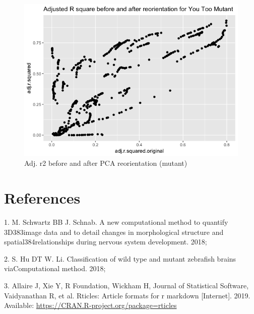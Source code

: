 \documentclass[10pt,letterpaper]{article}
\begin{document}
\begin{figure}[H]
\includegraphics[width=0.9\linewidth]{visualization_paper/r2_ro_comparison_yt} \caption{Adj. r2 before and after PCA reorientation (mutant)}\label{fig:Figure6}
\end{figure}

\section*{References}\label{references}

\hypertarget{refs}{}
\hypertarget{ref-Schwartz18}{}
1. M. Schwartz BB J. Schnab. A new computational method to quantify
3D383image data and to detail changes in morphological structure and
spatial384relationships during nervous system development. 2018;

\hypertarget{ref-Hu18}{}
2. S. Hu DT W. Li. Classification of wild type and mutant zebrafish
brains viaComputational method. 2018;

\hypertarget{ref-rticles19}{}
3. Allaire J, Xie Y, R Foundation, Wickham H, Journal of Statistical
Software, Vaidyanathan R, et al. Rticles: Article formats for r markdown
{[}Internet{]}. 2019. Available:
\url{https://CRAN.R-project.org/package=rticles}

\nolinenumbers
\end{document}
